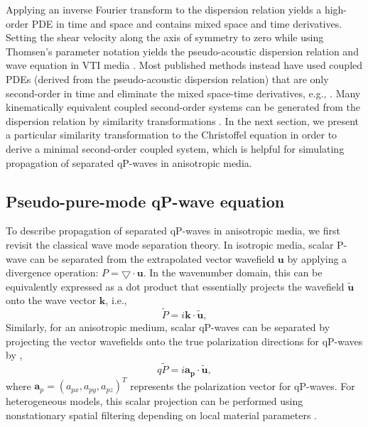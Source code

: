 Applying an inverse Fourier transform to the dispersion relation yields a high-order PDE in time and space
 and contains mixed space and time derivatives. Setting the shear velocity along the axis of symmetry to zero
while using Thomsen's parameter notation yields the pseudo-acoustic dispersion relation and wave equation
 in VTI media \cite[]{alkhalifah:2000}. Most published methods instead
 have used coupled PDEs (derived from the pseudo-acoustic dispersion relation) that are only second-order in time and
 eliminate the mixed space-time derivatives, e.g., \cite{zhou:2006eage}. Many kinematically equivalent
 coupled second-order systems can be generated from the dispersion relation
 by similarity transformations \cite[]{fowler:2010}. In the next section, we present a particular similarity
 transformation to the Christoffel equation in order to derive a minimal second-order coupled system,
 which is helpful for simulating propagation of separated qP-waves in anisotropic media.

\subsection{Pseudo-pure-mode qP-wave equation}
To describe propagation of separated qP-waves in anisotropic media, we first revisit the classical wave mode
 separation theory. In isotropic media, scalar P-wave can be separated from the extrapolated
 vector wavefield $\mathbf{u}$ by applying a divergence operation: $P = \bigtriangledown\cdot{\mathbf{u}}$.
 In the wavenumber domain,
this can be equivalently expressed as a dot product that essentially projects the wavefield
	$\widetilde{\mathbf{u}}$ onto the wave vector $\mathbf{k}$, i.e.,
\begin{equation}
\label{eq:PSep}
\widetilde{P} = i\mathbf{k}\cdot{\widetilde{\mathbf{u}}},
\end{equation}
Similarly, for an anisotropic medium, scalar qP-waves can be separated
by projecting the vector wavefields onto the true polarization
 directions for qP-waves by
\cite[]{dellinger.etgen:1990, yan.sava:2009},
\begin{equation}
\label{eq:qPSep}
q\widetilde{P} = i\mathbf{a_{p}}\cdot{\widetilde{\mathbf{u}}},
\end{equation}
where $\mathbf{a}_{p}=(a_{px},a_{py},a_{pz})^{T}$ represents the polarization vector for qP-waves.
For heterogeneous models, this scalar projection can be performed using
nonstationary spatial filtering depending on local material parameters \cite[]{yan.sava:2009}.

